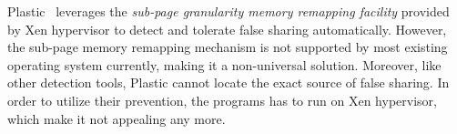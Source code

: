 Plastic~\cite{OSdetection} leverages the {\it sub-page granularity memory remapping facility}
provided by Xen hypervisor to detect and tolerate false sharing automatically.
However, the sub-page memory remapping mechanism is not supported by most existing operating 
system currently, making it a non-universal solution. Moreover, like other
detection tools, Plastic cannot locate the exact source of false sharing.  
In order to utilize their prevention, the programs has to run on Xen hypervisor, 
which make it not appealing any more.
